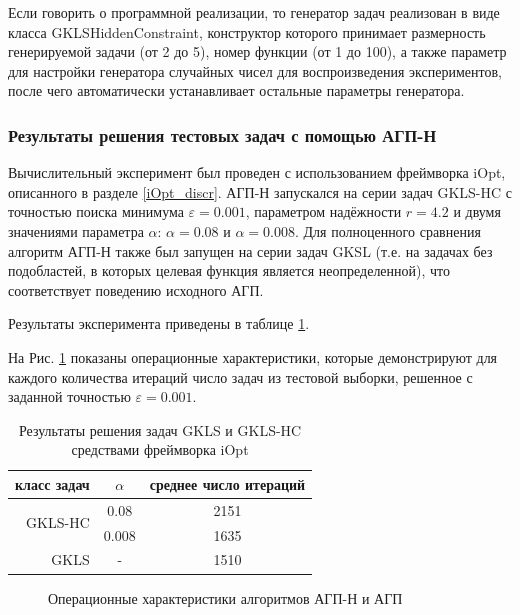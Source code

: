 \documentclass[a4paper,12pt,russian]{article}
\begin{document}
Если говорить о программной реализации, то генератор задач реализован в виде класса GKLSHiddenConstraint, конструктор которого принимает размерность генерируемой задачи (от 2 до 5), номер функции (от 1 до 100), а также параметр для настройки генератора случайных чисел для воспроизведения экспериментов, после чего автоматически устанавливает остальные параметры генератора.

\subsubsection{Результаты решения тестовых задач с помощью АГП-Н}

Вычислительный эксперимент был проведен с использованием фреймворка iOpt, описанного в разделе \ref{iOpt_discr}. АГП-Н запускался на серии задач GKLS-HC с точностью поиска минимума $\varepsilon = 0.001$, параметром надёжности $r = 4.2$ и двумя значениями параметра $\alpha$: $\alpha = 0.08$ и $\alpha = 0.008$. Для полноценного сравнения алгоритм АГП-Н также был запущен на серии задач GKSL (т.е. на задачах без подобластей, в которых целевая функция является неопределенной), что соответствует поведению исходного АГП.

Результаты эксперимента приведены в таблице \ref{iOpt_gkls}.

На Рис. \ref{oper_charact} показаны операционные характеристики, которые демонстрируют для каждого количества итераций число задач из тестовой выборки, решенное с заданной точностью $\varepsilon = 0.001$. 

\begin{table}[h!]
\centering
\caption{Результаты решения задач GKLS и GKLS-HC средствами фреймворка iOpt}
\begin{tabular}{|r|c|c|}
\hline
 класс задач & $\alpha$ & среднее число итераций \\ \hline\hline
\multirow{2}{*}{GKLS-HC} & 0.08 & 2151 \\ \cline{2-3} 
 & 0.008 & 1635 \\ \hline
GKLS & - & 1510 \\ \hline
\end{tabular}
\label{iOpt_gkls}
\end{table}

\begin{figure}[h!]
	\caption{Операционные характеристики алгоритмов АГП-Н и АГП}
	\label{oper_charact}
\end{figure}
\end{document}
